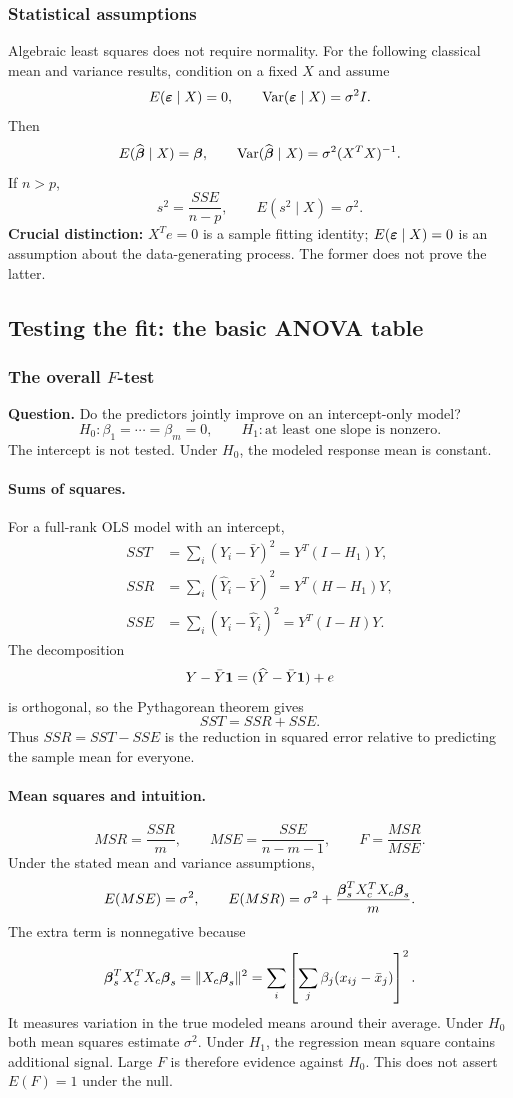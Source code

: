 \documentclass[11pt]{article}
\begin{document}
\subsubsection*{Statistical assumptions}
Algebraic least squares does not require normality. For the following classical mean and variance results, condition on a fixed $X$ and assume
\[
E(\boldsymbol\varepsilon\mid X)=0,\qquad \operatorname{Var}(\boldsymbol\varepsilon\mid X)=\sigma^2I.
\]
Then
\[
E(\widehat{\boldsymbol\beta}\mid X)=\boldsymbol\beta,\qquad
\operatorname{Var}(\widehat{\boldsymbol\beta}\mid X)=\sigma^2(X^TX)^{-1}.
\]
If $n>p$,
\[
s^2=\frac{SSE}{n-p},\qquad E(s^2\mid X)=\sigma^2.
\]
\textbf{Crucial distinction:} $X^Te=0$ is a sample fitting identity; $E(\boldsymbol\varepsilon\mid X)=0$ is an assumption about the data-generating process. The former does not prove the latter.

\subsection{Testing the fit: the basic ANOVA table}
\subsubsection{The overall $F$-test}
\textbf{Question.} Do the predictors jointly improve on an intercept-only model?
\[
H_0:\beta_1=\cdots=\beta_m=0,
\qquad H_1:\text{at least one slope is nonzero}.
\]
The intercept is not tested. Under $H_0$, the modeled response mean is constant.

\paragraph{Sums of squares.}
For a full-rank OLS model with an intercept,
\begin{align*}
SST&=\sum_i(Y_i-\bar Y)^2=Y^T(I-H_1)Y,\\
SSR&=\sum_i(\widehat Y_i-\bar Y)^2=Y^T(H-H_1)Y,\\
SSE&=\sum_i(Y_i-\widehat Y_i)^2=Y^T(I-H)Y.
\end{align*}
The decomposition
\[
Y-\bar Y\mathbf 1=(\widehat Y-\bar Y\mathbf 1)+e
\]
is orthogonal, so the Pythagorean theorem gives
\[
\boxed{SST=SSR+SSE.}
\]
Thus $SSR=SST-SSE$ is the reduction in squared error relative to predicting the sample mean for everyone.

\paragraph{Mean squares and intuition.}
\[
MSR=\frac{SSR}{m},\qquad MSE=\frac{SSE}{n-m-1},\qquad
\boxed{F=\frac{MSR}{MSE}.}
\]
Under the stated mean and variance assumptions,
\[
E(MSE)=\sigma^2,\qquad
E(MSR)=\sigma^2+\frac{\boldsymbol\beta_s^TX_c^TX_c\boldsymbol\beta_s}{m}.
\]
The extra term is nonnegative because
\[
\boldsymbol\beta_s^TX_c^TX_c\boldsymbol\beta_s=\|X_c\boldsymbol\beta_s\|^2
=\sum_i\left[\sum_j\beta_j(x_{ij}-\bar x_j)\right]^2.
\]
It measures variation in the true modeled means around their average. Under $H_0$ both mean squares estimate $\sigma^2$. Under $H_1$, the regression mean square contains additional signal. Large $F$ is therefore evidence against $H_0$. This does not assert $E(F)=1$ under the null.
\end{document}
